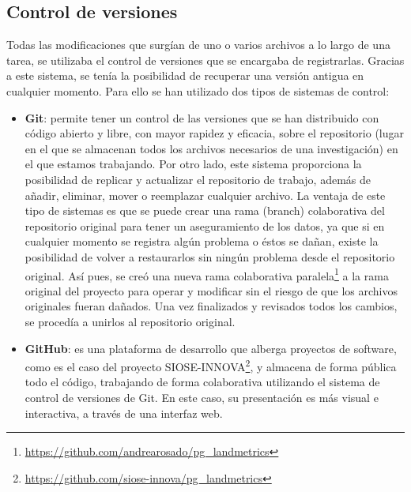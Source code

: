 \subsection{Control de versiones}
Todas las modificaciones que surgían de uno o varios archivos a lo largo de una tarea, se utilizaba el control de versiones que se encargaba de registrarlas. Gracias a este sistema, se tenía la posibilidad de recuperar una versión antigua en cualquier momento. Para ello se han utilizado dos tipos de sistemas de control:
\begin{itemize}
\item\textbf{Git}: permite tener un control de las versiones que se han distribuido con código abierto y libre, con mayor rapidez y eficacia, sobre el repositorio (lugar en el que se almacenan todos los archivos necesarios de una investigación) en el que estamos trabajando. Por otro lado, este sistema proporciona la posibilidad de replicar y actualizar el repositorio de trabajo, además de añadir, eliminar, mover o reemplazar cualquier archivo. La ventaja de este tipo de sistemas es que se puede crear una rama (branch) colaborativa del repositorio original para tener un aseguramiento de los datos, ya que si en cualquier momento se registra algún problema o éstos se dañan, existe la posibilidad de volver a restaurarlos sin ningún problema desde el repositorio original. Así pues, se creó una nueva rama colaborativa paralela\footnote{\url{https://github.com/andrearosado/pg_landmetrics}} a la rama original del proyecto para operar y modificar sin el riesgo de que los archivos originales fueran dañados. Una vez finalizados y revisados todos los cambios, se procedía a unirlos al repositorio original.
\item\textbf{GitHub}: es una plataforma de desarrollo que alberga proyectos de software, como es el caso del proyecto SIOSE-INNOVA\footnote{\url{https://github.com/siose-innova/pg_landmetrics}}, y almacena de forma pública todo el código, trabajando de forma colaborativa utilizando el sistema de control de versiones de Git. En este caso, su presentación es más visual e interactiva, a través de una interfaz web.
\end{itemize}

